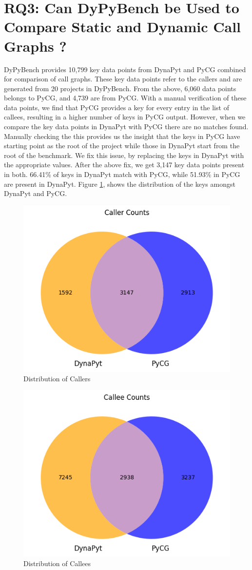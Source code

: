 \section{RQ3: Can DyPyBench be Used to Compare Static and Dynamic Call Graphs ? }

DyPyBench provides 10,799 key data points from DynaPyt and PyCG combined for comparison of call graphs.
These key data points refer to the callers and are generated from 20 projects in DyPyBench.
From the above, 6,060 data points belongs to PyCG, and 4,739 are from PyCG.
With a manual verification of these data points, we find that PyCG provides a key for every entry in the list of callees, resulting in a higher number of keys in PyCG output.
However, when we compare the key data points in DynaPyt with PyCG there are no matches found.
Manually checking the this provides us the insight that the keys in PyCG have starting point as the root of the project while those in DynaPyt start from the root of the benchmark.
We fix this issue, by replacing the keys in DynaPyt with the appropriate values.
After the above fix, we get 3,147 key data points present in both.
66.41\% of keys in DynaPyt match with PyCG, while 51.93\% in PyCG are present in DynaPyt.
Figure \ref{fig:caller counts}, shows the distribution of the keys amongst DynaPyt and PyCG.
\begin{figure}[ht]
    \centering
    \includegraphics[width=0.5\linewidth]{figures/evaluation/callercounts.png}
    \caption[Distribution of Callers]{\label{fig:caller counts}Distribution of Callers }
\end{figure}
\begin{figure}[ht]
    \centering
    \includegraphics[width=0.5\linewidth]{figures/evaluation/calleecounts.png}
    \caption[Distribution of Callees]{\label{fig:callee_counts}Distribution of Callees}
\end{figure}

